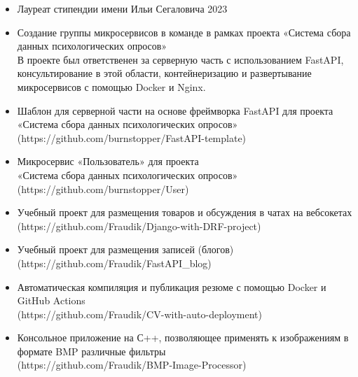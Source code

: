 
\vspace{10pt}


\vspace{10pt}

\begin{itemize}
\item Лауреат стипендии имени Ильи Сегаловича 2023
\end{itemize}

\vspace{6.2pt}

\begin{itemize}
\item Создание группы микросервисов в команде в рамках проекта «Система сбора данных психологических опросов» \\
В проекте был ответственен за серверную часть с использованием FastAPI, консультирование в этой области, контейнеризацию и развертывание микросервисов с помощью Docker и Nginx. \\
\item Шаблон для серверной части на основе фреймворка FastAPI для проекта «Система сбора данных психологических опросов» \\
(https://github.com/burnstopper/FastAPI-template) \\
\item Микросервис «Пользователь» для проекта \\ «Система сбора данных психологических опросов» \\
(https://github.com/burnstopper/User) \\
\item Учебный проект для размещения товаров и обсуждения в чатах на вебсокетах \\
(https://github.com/Fraudik/Django-with-DRF-project) \\
\item Учебный проект для размещения записей (блогов) \\
(https://github.com/Fraudik/FastAPI\_blog) \\
\item Автоматическая компиляция и публикация резюме с помощью Docker и GitHub Actions \\
(https://github.com/Fraudik/CV-with-auto-deployment) \\
\item  Консольное приложение на С++, позволяющее применять к изображениям в формате BMP различные фильтры \\
(https://github.com/Fraudik/BMP-Image-Processor) \\
\end{itemize}
